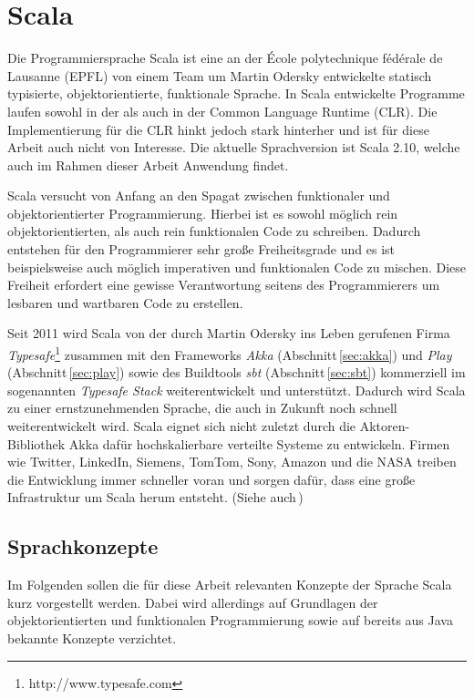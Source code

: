 \section{Scala}

Die Programmiersprache Scala ist eine an der École polytechnique fédérale de Lausanne (EPFL) von
einem Team um Martin Odersky entwickelte statisch typisierte,  objektorientierte, funktionale
Sprache. In Scala entwickelte Programme laufen  sowohl in der  als auch in der Common
Language Runtime (CLR). Die Implementierung für die CLR hinkt jedoch stark  hinterher und ist für
diese Arbeit auch nicht von Interesse. Die aktuelle Sprachversion ist Scala 2.10, welche auch im
Rahmen dieser Arbeit Anwendung findet.

Scala versucht von Anfang an den Spagat zwischen funktionaler und  objektorientierter
Programmierung. Hierbei ist es sowohl möglich  rein objektorientierten, als auch rein funktionalen
Code zu schreiben. Dadurch  entstehen für den Programmierer sehr große Freiheitsgrade und es ist
beispielsweise auch möglich imperativen und funktionalen Code zu mischen. Diese  Freiheit erfordert
eine gewisse Verantwortung seitens des Programmierers um  lesbaren und wartbaren Code zu erstellen.

Seit 2011 wird Scala von der durch Martin Odersky ins Leben gerufenen Firma
\textit{Typesafe}\footnote{http://www.typesafe.com} zusammen mit den Frameworks \textit{Akka}
(Abschnitt\,\ref{sec:akka}) und \textit{Play} (Abschnitt\,\ref{sec:play}) sowie des Buildtools
\textit{sbt} (Abschnitt\,\ref{sec:sbt}) kommerziell im sogenannten \textit{Typesafe Stack}
weiterentwickelt und unterstützt. Dadurch wird Scala zu einer ernstzunehmenden Sprache, die auch in
Zukunft noch schnell weiterentwickelt wird. Scala eignet sich nicht zuletzt durch die Aktoren-
Bibliothek Akka dafür hochskalierbare verteilte Systeme zu entwickeln. Firmen wie Twitter, LinkedIn,
Siemens, TomTom, Sony, Amazon und die NASA treiben die Entwicklung immer schneller voran und sorgen
dafür, dass eine große Infrastruktur um Scala herum entsteht. (Siehe auch\,\cite{scala})

\subsection{Sprachkonzepte}

Im Folgenden sollen die für diese Arbeit relevanten Konzepte der Sprache Scala kurz vorgestellt
werden. Dabei wird allerdings auf Grundlagen der objektorientierten und funktionalen Programmierung
sowie auf bereits aus Java bekannte Konzepte verzichtet.

